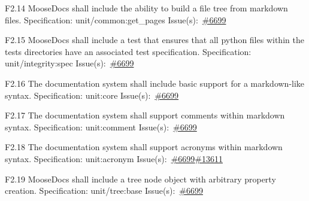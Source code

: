 \begin{Requirement}{F2.14}
MooseDocs shall include the ability to build a file tree from markdown files.
\newline
Specification: unit/common:get\_pages
\newline
Issue(s):~\href{https://github.com/idaholab/moose/issues/6699}{\#6699}
\end{Requirement}

\begin{Requirement}{F2.15}
MooseDocs shall include a test that ensures that all python files within the tests directories have an associated test specification.
\newline
Specification: unit/integrity:spec
\newline
Issue(s):~\href{https://github.com/idaholab/moose/issues/6699}{\#6699}
\end{Requirement}

\begin{Requirement}{F2.16}
The documentation system shall include basic support for a markdown-like syntax.
\newline
Specification: unit:core
\newline
Issue(s):~\href{https://github.com/idaholab/moose/issues/6699}{\#6699}
\end{Requirement}

\begin{Requirement}{F2.17}
The documentation system shall support comments within markdown syntax.
\newline
Specification: unit:comment
\newline
Issue(s):~\href{https://github.com/idaholab/moose/issues/6699}{\#6699}
\end{Requirement}

\begin{Requirement}{F2.18}
The documentation system shall support acronyms within markdown syntax.
\newline
Specification: unit:acronym
\newline
Issue(s):~\href{https://github.com/idaholab/moose/issues/6699}{\#6699}\href{https://github.com/idaholab/moose/issues/13611}{\#13611}
\end{Requirement}

\begin{Requirement}{F2.19}
MooseDocs shall include a tree node object with arbitrary property creation.
\newline
Specification: unit/tree:base
\newline
Issue(s):~\href{https://github.com/idaholab/moose/issues/6699}{\#6699}
\end{Requirement}

